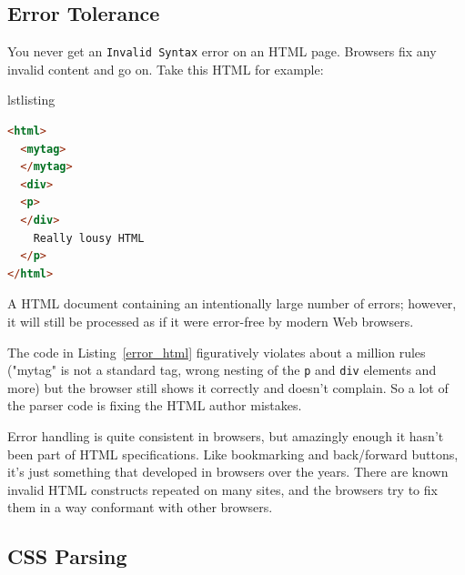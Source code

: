 \documentclass[a4paper, justified, notoc]{tufte-handout} %
\makeatletter
\newenvironment{listing}[1][htbp]
  {\ifvmode\else\unskip\fi\begin{@tufte@float}[#1]{lstlisting}{}}
  {\end{@tufte@float} } %
\makeatother
\begin{document}
%
%
%


\subsection{Error Tolerance} %
\label{sub:error_tollerance}

You never get an \texttt{Invalid Syntax} error on an HTML page. Browsers fix any invalid content and go on.
Take this HTML for example:

\begin{listing}
\begin{lstlisting}[language=HTML]
<html>
  <mytag>
  </mytag>
  <div>
  <p>
  </div>
    Really lousy HTML
  </p>
</html>
\end{lstlisting}
	\caption{A HTML document containing an intentionally large number of errors; however, it will still be processed as if it were error-free by modern Web browsers.}
	\label{error_html}
\end{listing}

The code in Listing~\ref{error_html} figuratively violates about a million rules ("mytag" is not a standard tag, wrong nesting of the \texttt{p} and \texttt{div} elements and more) but the browser still shows it correctly and doesn't complain. So a lot of the parser code is fixing the HTML author mistakes.

Error handling is quite consistent in browsers, but amazingly enough it hasn't been part of HTML specifications. Like bookmarking and back/forward buttons, it's just something that developed in browsers over the years. There are known invalid HTML constructs repeated on many sites, and the browsers try to fix them in a way conformant with other browsers.




\subsection{CSS Parsing} %
\label{sub:css_parsing}
\end{document}
